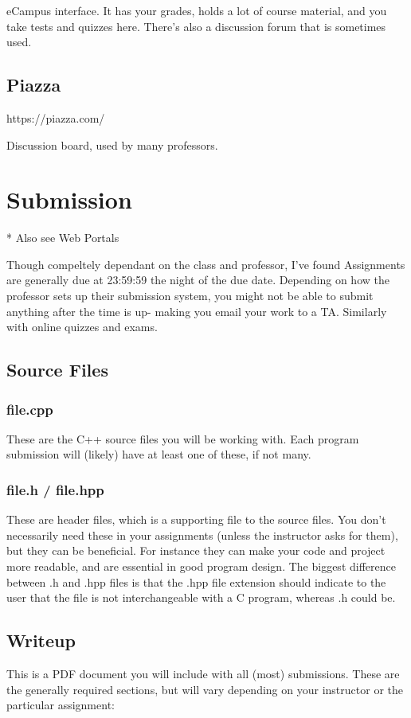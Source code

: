 \documentclass[letterpaper,10pt,titlepage,fleqn]{article}
\begin{document}
eCampus interface. It has your grades, holds a lot of course material, and you
take tests and quizzes here. There’s also a discussion forum that is sometimes
used.


\subsection{Piazza}
https://piazza.com/

Discussion board, used by many professors.


\section{Submission}
* Also see Web Portals

Though compeltely dependant on the class and professor, I've found Assignments
are generally due at 23:59:59 the night of the due date. Depending on how the
professor sets up their submission system, you might not be able to submit
anything after the time is up- making you email your work to a TA. Similarly with online quizzes
and exams. 



\subsection{Source Files}
\subsubsection{file.cpp}
These are the C++ source files you will be working with. Each program submission
will (likely) have at least one of these, if not many.


\subsubsection{file.h / file.hpp}
These are header files, which is a supporting file to the source files. You
don't necessarily need these in your assignments (unless the instructor asks for
them), but they can be beneficial. For instance they can make your code and project
more readable, and are essential in good program design. The biggest difference
between .h and .hpp files is that the .hpp file extension should indicate to the
user that the file is not interchangeable with a C program, whereas .h could be.


\subsection{Writeup}
This is a PDF document you will include with all (most) submissions.
These are the generally required sections, but will vary depending on your
instructor or the particular assignment:
\end{document}
